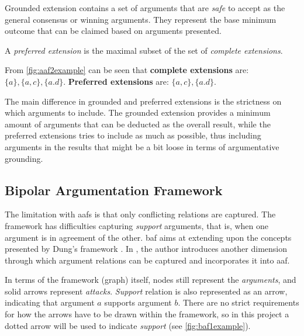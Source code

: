             Grounded extension contains a set of arguments that are \textit{safe} to accept as the general consensus or winning arguments. They represent the base minimum outcome that can be claimed based on arguments presented.
            
            
            \begin{definition}
                A \textit{preferred extension} is the maximal subset of the set of \textit{complete extensions}.
                \label{definition:definition9}
            \end{definition}
            \begin{exa}
                From \autoref{fig:aaf2example} can be seen that \textbf{complete extensions} are: $\{a\}, \{a, c\}, \{a. d\}$. \textbf{Preferred extensions} are: $\{a, c\}, \{a. d\}$.
                \label{exa:example9}
            \end{exa}
            
            The main difference in grounded and preferred extensions is the strictness on which arguments to include. The grounded extension provides a minimum amount of arguments that can be deducted as the overall result, while the preferred extensions tries to include as much as possible, thus including arguments in the results that might be a bit loose in terms of argumentative grounding.
        
    \subsection{Bipolar Argumentation Framework} \label{baf}
        The limitation with \gls{aaf}s is that only conflicting relations are captured. The framework has difficulties capturing \textit{support} arguments, that is, when one argument is in agreement of the other. \gls{baf} aims at extending upon the concepts presented by Dung's framework \autocite{Dung1995OnTA}. In \autocite{Cayrol2005OnTA}, the author introduces another dimension through which argument relations can be captured and incorporates it into \gls{aaf}. 
        
        In terms of the framework (graph) itself, nodes still represent the \textit{arguments}, and solid arrows represent \textit{attacks}. \textit{Support} relation is also represented as an arrow, indicating that argument $a$ supports argument $b$. There are no strict requirements for how the arrows have to be drawn within the framework, so in this project a dotted arrow will be used to indicate \textit{support} (see \autoref{fig:baf1example}).
        
